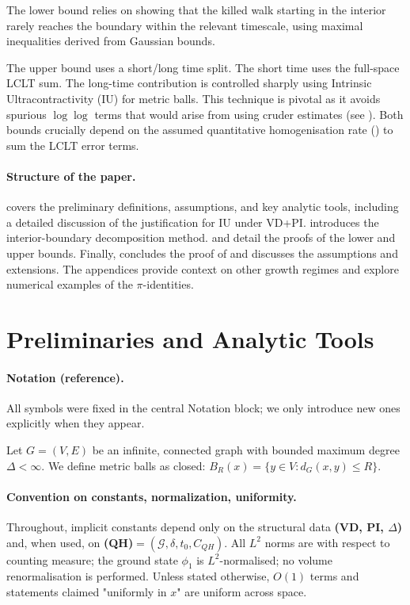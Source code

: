 \documentclass{article}
\numberwithin{equation}{section}
\theoremstyle{definition}
\theoremstyle{remark}
\newcommand{\cG}{\mathcal{G}}
\begin{document}
The lower bound relies on showing that the killed walk starting in the interior rarely reaches the boundary within the relevant timescale, using maximal inequalities derived from Gaussian bounds.

The upper bound uses a short/long time split. The short time uses the full-space LCLT sum. The long-time contribution is controlled sharply using Intrinsic Ultracontractivity (IU) for metric balls. This technique is pivotal as it avoids spurious $\log\log$ terms that would arise from using cruder estimates (see ). Both bounds crucially depend on the assumed quantitative homogenisation rate () to sum the LCLT error terms.

\paragraph{Structure of the paper.}
 covers the preliminary definitions, assumptions, and key analytic tools, including a detailed discussion of the justification for IU under VD+PI.  introduces the interior-boundary decomposition method.  and  detail the proofs of the lower and upper bounds. Finally,  concludes the proof of  and discusses the assumptions and extensions. The appendices provide context on other growth regimes and explore numerical examples of the $\pi$-identities.


\section{Preliminaries and Analytic Tools}\label{sec:prelim}


\paragraph{Notation (reference).} All symbols were fixed in the central Notation block; we only introduce new ones explicitly when they appear.

Let $G = (V,E)$ be an infinite, connected graph with bounded maximum degree $\Delta < \infty$. We define metric balls as closed: $B_R(x) = \{y \in V : d_G(x,y) \leq R\}$.

\paragraph{Convention on constants, normalization, uniformity.}
Throughout, implicit constants depend only on the structural data \textbf{(VD, PI, $\Delta$)} and, when used, on \textbf{(QH)}$=(\cG,\delta,t_0,C_{QH})$. All $L^2$ norms are with respect to counting measure; the ground state $\phi_1$ is $L^2$-normalised; no volume renormalisation is performed. Unless stated otherwise, $O(1)$ terms and statements claimed "uniformly in $x$" are uniform across space.
\end{document}
